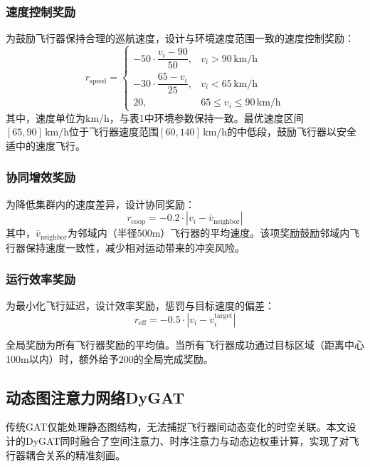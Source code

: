 \documentclass[12pt,a4paper,UTF8]{ctexart}
\begin{document}
\subsubsection{速度控制奖励}
为鼓励飞行器保持合理的巡航速度，设计与环境速度范围一致的速度控制奖励：
\begin{equation}
    r_{\text{speed}} =
    \begin{cases}
        -50 \cdot \dfrac{v_i - 90}{50}, & v_i > 90\,\text{km/h} \\[8pt]
        -30 \cdot \dfrac{65 - v_i}{25}, & v_i < 65\,\text{km/h} \\[8pt]
        20, & 65 \leq v_i \leq 90\,\text{km/h}
    \end{cases}
    \label{eq:rspeed}
\end{equation}
其中，速度单位为km/h，与表1中环境参数保持一致。最优速度区间$[65, 90]\,\text{km/h}$位于飞行器速度范围$[60, 140]\,\text{km/h}$的中低段，鼓励飞行器以安全适中的速度飞行。

\subsubsection{协同增效奖励}
为降低集群内的速度差异，设计协同奖励：
\begin{equation}
    r_{\text{coop}} = -0.2 \cdot |v_i - \bar{v}_{\text{neighbor}}|
\end{equation}
其中，$\bar{v}_{\text{neighbor}}$为邻域内（半径500m）飞行器的平均速度。该项奖励鼓励邻域内飞行器保持速度一致性，减少相对运动带来的冲突风险。

\subsubsection{运行效率奖励}
为最小化飞行延迟，设计效率奖励，惩罚与目标速度的偏差：
\begin{equation}
    r_{\text{eff}} = -0.5 \cdot |v_i - v_i^{\text{target}}|
\end{equation}

全局奖励为所有飞行器奖励的平均值。当所有飞行器成功通过目标区域（距离中心100m以内）时，额外给予$200$的全局完成奖励。

\subsection{动态图注意力网络DyGAT}
传统GAT仅能处理静态图结构，无法捕捉飞行器间动态变化的时空关联。本文设计的DyGAT同时融合了空间注意力、时序注意力与动态边权重计算，实现了对飞行器耦合关系的精准刻画。
\end{document}
